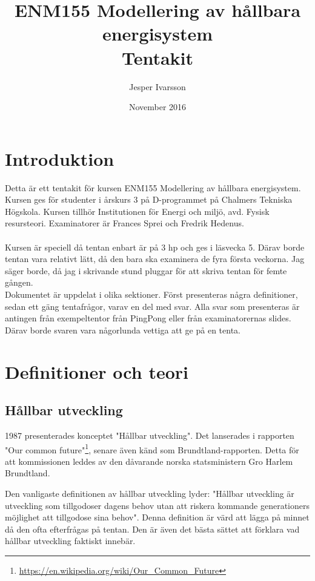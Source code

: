 \documentclass{article}
\title{ENM155 Modellering av hållbara energisystem\\Tentakit}
\author{Jesper Ivarsson}
\date{November 2016}
\begin{document}
\maketitle

\section{Introduktion}
Detta är ett tentakit för kursen ENM155 Modellering av hållbara energisystem. Kursen ges för studenter i årskurs 3 på D-programmet på Chalmers Tekniska Högskola. Kursen tillhör Institutionen för Energi och miljö, avd. Fysisk resursteori. Examinatorer är Frances Sprei och Fredrik Hedenus. \\
\\
Kursen är speciell då tentan enbart är på 3 hp och ges i läsvecka 5. Därav borde tentan vara relativt lätt, då den bara ska examinera de fyra första veckorna. Jag säger borde, då jag i skrivande stund pluggar för att skriva tentan för femte gången.
\\
Dokumentet är uppdelat i olika sektioner. Först presenteras några definitioner, sedan ett gäng tentafrågor, varav en del med svar. Alla svar som presenteras är antingen från exempeltentor från PingPong eller från examinatorernas slides. Därav borde svaren vara någorlunda vettiga att ge på en tenta.

\section{Definitioner och teori}
\subsection{Hållbar utveckling}

1987 presenterades konceptet "Hållbar utveckling". Det lanserades i rapporten "Our common future"\footnote{\url{https://en.wikipedia.org/wiki/Our_Common_Future}}, senare även känd som Brundtland-rapporten. Detta för att kommissionen leddes av den dåvarande norska statsministern Gro Harlem Brundtland.

Den vanligaste definitionen av hållbar utveckling lyder: "Hållbar utveckling är utveckling som tillgodoser dagens behov utan att riskera kommande generationers möjlighet att tillgodose sina behov". Denna definition är värd att lägga på minnet då den ofta efterfrågas på tentan. Den är även det bästa sättet att förklara vad hållbar utveckling faktiskt innebär. 
\end{document}
